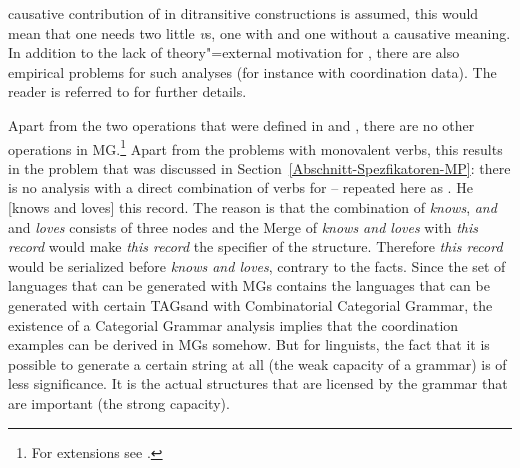 causative contribution of \littlev in ditransitive constructions is assumed, this would mean that
one needs two little \emph{v}s, one with and one without a causative meaning.
%
%
In addition to the lack of theory"=external motivation for \littlev, there are also empirical
problems for such analyses (for instance with coordination data). The reader is referred to  for further
details.


Apart from the two operations that were defined in  and ,
there are no other operations in MG.\footnote{%
  For extensions see .
}
Apart from the problems with monovalent verbs, this results in the problem that was discussed in
Section~\ref{Abschnitt-Spezfikatoren-MP}: there is no analysis with a direct combination of verbs for
 -- repeated here as .
\ea
\label{ex-he-knows-and-loves-this-record-MP-zwei}
He [knows and loves] this record.
\z
The reason is that the combination of \emph{knows}, \emph{and} and \emph{loves} consists of three
nodes and the Merge of \emph{knows and loves} with \emph{this record} would make \emph{this record}
the specifier of the structure. Therefore \emph{this record} would be serialized before \emph{knows
  and loves}, contrary to the facts. 
Since the set of languages that can be generated with MGs
contains the languages that can be generated with certain TAGs\indextag and with Combinatorial Categorial
Grammar\indexcg \citep{Michaelis2001a-u}, the existence of a Categorial Grammar analysis implies that the
coordination examples can be derived in MGs somehow. But for linguists, the fact that it is possible
 to generate a certain string at all (the weak capacity of a grammar) is of less significance. It is the
actual structures that are licensed by the grammar that are important (the strong capacity). 

